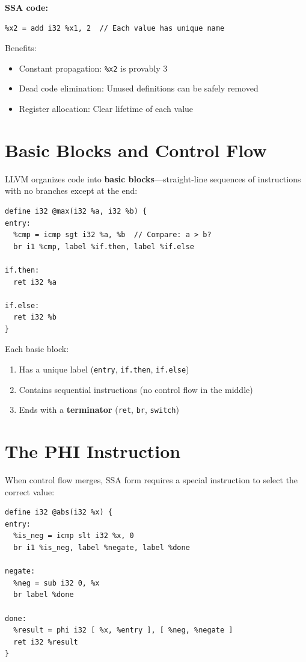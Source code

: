 \documentclass[11pt,oneside]{book}
\begin{document}
\textbf{SSA code:}
\begin{lstlisting}[style=ir]
%x1 = 1
%x2 = add i32 %x1, 2  // Each value has unique name
\end{lstlisting}

Benefits:
\begin{itemize}[noitemsep]
  \item Constant propagation: \texttt{\%x2} is provably 3
  \item Dead code elimination: Unused definitions can be safely removed
  \item Register allocation: Clear lifetime of each value
\end{itemize}

\section{Basic Blocks and Control Flow}

LLVM organizes code into \textbf{basic blocks}—straight-line sequences of instructions with no branches except at the end:

\begin{lstlisting}[style=ir]
define i32 @max(i32 %a, i32 %b) {
entry:
  %cmp = icmp sgt i32 %a, %b  // Compare: a > b?
  br i1 %cmp, label %if.then, label %if.else

if.then:
  ret i32 %a

if.else:
  ret i32 %b
}
\end{lstlisting}

Each basic block:
\begin{enumerate}[noitemsep]
  \item Has a unique label (\texttt{entry}, \texttt{if.then}, \texttt{if.else})
  \item Contains sequential instructions (no control flow in the middle)
  \item Ends with a \textbf{terminator} (\texttt{ret}, \texttt{br}, \texttt{switch})
\end{enumerate}

\section{The PHI Instruction}

When control flow merges, SSA form requires a special instruction to select the correct value:

\begin{lstlisting}[style=ir]
define i32 @abs(i32 %x) {
entry:
  %is_neg = icmp slt i32 %x, 0
  br i1 %is_neg, label %negate, label %done

negate:
  %neg = sub i32 0, %x
  br label %done

done:
  %result = phi i32 [ %x, %entry ], [ %neg, %negate ]
  ret i32 %result
}
\end{lstlisting}
\end{document}
